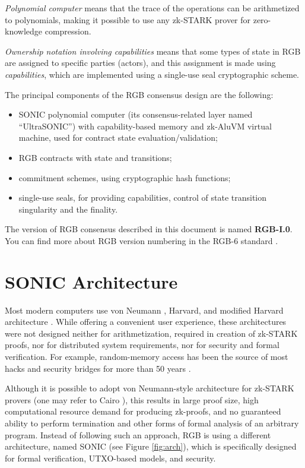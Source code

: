 \documentclass[9pt,oneside]{amsart}
\begin{document}
\begin{multicols}{2}
\emph{Polynomial computer} means that the trace of the operations can be arithmetized to polynomials,
making it possible to use any zk-STARK prover for zero-knowledge compression.

\emph{Ownership notation involving capabilities} means that some types of state in RGB
are assigned to specific parties (actors), and this assignment is made using \emph{capabilities},
which are implemented using a single-use seal cryptographic scheme.

The principal components of the RGB consensus design are the following:
\begin{itemize}
  \item SONIC polynomial computer (its consensus-related layer named ``UltraSONIC'')
  with capability-based memory and zk-AluVM virtual machine,
  used for contract state evaluation/validation;
  \item RGB contracts with state and transitions;
  \item commitment schemes, using cryptographic hash functions;
  \item single-use seals, for providing capabilities,
  control of state transition singularity and the finality.
\end{itemize}

The version of RGB consensus described in this document is named \textbf{RGB-I.0}.
You can find more about RGB version numbering in the RGB-6 standard \cite{RGB6}.

\section{SONIC Architecture}\label{Sonic}

Most modern computers use von Neumann \cite{vonNeumann},
Harvard, and modified Harvard architecture \cite{Harvard}.
While offering a convenient user experience, these architectures were not designed neither for
arithmetization, required in creation of zk-STARK proofs, nor for distributed system requirements,
nor for security and formal verification.
For example, random-memory access has been the source
of most hacks and security bridges for more than 50 years \cite{RAMsucks1, RAMsucks2, RAMsucks3}.

Although it is possible to adopt von Neumann-style architecture for zk-STARK provers
(one may refer to Cairo \cite{Cairo}), this results in large proof size,
high computational resource demand for producing zk-proofs,
and no guaranteed ability to perform termination and
other forms of formal analysis of an arbitrary program.
Instead of following such an approach, RGB is using a different architecture,
named SONIC (see Figure \ref{fig:arch}),
which is specifically designed for formal verification, UTXO-based models, and security.

\end{multicols}
\end{document}

